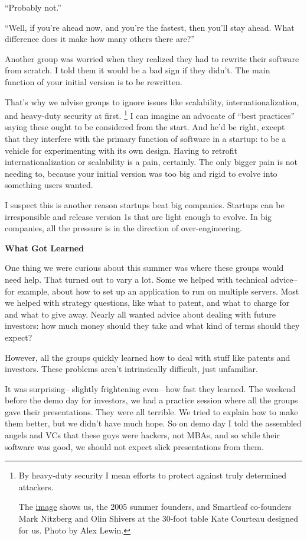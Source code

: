 ``Probably not.''

``Well, if you're ahead now, and you're the fastest, then you'll stay
ahead. What difference does it make how many others there are?''

Another group was worried when they realized they had to rewrite their
software from scratch. I told them it would be a bad sign if they
didn't. The main function of your initial version is to be rewritten.

That's why we advise groups to ignore issues like scalability,
internationalization, and heavy-duty security at first. \footnote{By heavy-duty security I mean efforts to protect against truly
determined attackers.

The
\href{https://sep.turbifycdn.com/ty/cdn/paulgraham/sfptable.jpg?t=1688221954&}{image}
shows us, the 2005 summer founders, and Smartleaf co-founders Mark
Nitzberg and Olin Shivers at the 30-foot table Kate Courteau designed
for us. Photo by Alex Lewin.} I can
imagine an advocate of ``best practices'' saying these ought to be
considered from the start. And he'd be right, except that they interfere
with the primary function of software in a startup: to be a vehicle for
experimenting with its own design. Having to retrofit
internationalization or scalability is a pain, certainly. The only
bigger pain is not needing to, because your initial version was too big
and rigid to evolve into something users wanted.

I suspect this is another reason startups beat big companies. Startups
can be irresponsible and release version 1s that are light enough to
evolve. In big companies, all the pressure is in the direction of
over-engineering.

\textbf{What Got Learned}

One thing we were curious about this summer was where these groups would
need help. That turned out to vary a lot. Some we helped with technical
advice-- for example, about how to set up an application to run on
multiple servers. Most we helped with strategy questions, like what to
patent, and what to charge for and what to give away. Nearly all wanted
advice about dealing with future investors: how much money should they
take and what kind of terms should they expect?

However, all the groups quickly learned how to deal with stuff like
patents and investors. These problems aren't intrinsically difficult,
just unfamiliar.

It was surprising-- slightly frightening even-- how fast they learned.
The weekend before the demo day for investors, we had a practice session
where all the groups gave their presentations. They were all terrible.
We tried to explain how to make them better, but we didn't have much
hope. So on demo day I told the assembled angels and VCs that these guys
were hackers, not MBAs, and so while their software was good, we should
not expect slick presentations from them.

